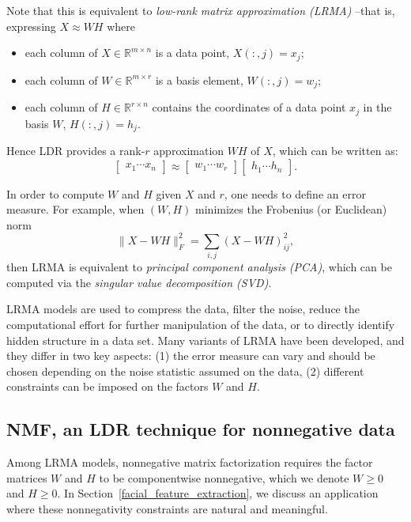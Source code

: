 \documentclass{amsart}
\newcommand{\R}{\mathbb{R}}
\begin{document}
Note that this is equivalent to {\it low-rank matrix approximation (LRMA)} --that is, expressing $X \approx WH$ where
\begin{itemize}
    \item each column of $X\in\R^{m\times n}$ is a data point, $X(:,j)=x_j$;
    \item each column of $W\in\R^{m\times r}$ is a basis element, $W(:,j)=w_j$;
    \item each column of $H\in\R^{r\times n}$ contains the coordinates of a data point $x_j$ in the basis $W$, $H(:,j)=h_j$.
\end{itemize}
Hence LDR provides a rank-$r$ approximation $WH$ of $X$, which can be written as:
\[
    \begin{bmatrix} x_1 \cdots x_n \end{bmatrix} \approx
    \begin{bmatrix} w_1 \cdots w_r \end{bmatrix}
    \begin{bmatrix} h_1 \cdots h_n \end{bmatrix}.
\]

\bigskip

In order to compute $W$ and $H$ given $X$ and $r$, one needs to define an error measure. For example, when $(W,H)$ minimizes the Frobenius (or Euclidean) norm
\[  
    \|X-WH\|_F^2 = \sum_{i,j} (X-WH)_{ij}^2,
\]
then LRMA is equivalent to {\it principal component analysis (PCA)}, which can be computed via the {\it singular value decomposition (SVD)}.

\bigskip

LRMA models are used to compress the data, filter the noise, reduce the computational effort for further manipulation of the data, or to directly identify hidden structure in a data set. Many variants of LRMA have been developed, and they differ in two key aspects: (1) the error measure can vary and should be chosen depending on the noise statistic assumed on the data,
(2) different constraints can be imposed on the factors $W$ and $H$.

\subsection{NMF, an LDR technique for nonnegative data}

Among LRMA models, nonnegative matrix factorization requires the factor matrices $W$ and $H$ to be componentwise nonnegative, which we denote $W\geq 0$ and $H\geq 0$. In Section~\ref{facial_feature_extraction}, we discuss an application where these nonnegativity constraints are natural and meaningful.
\end{document}
